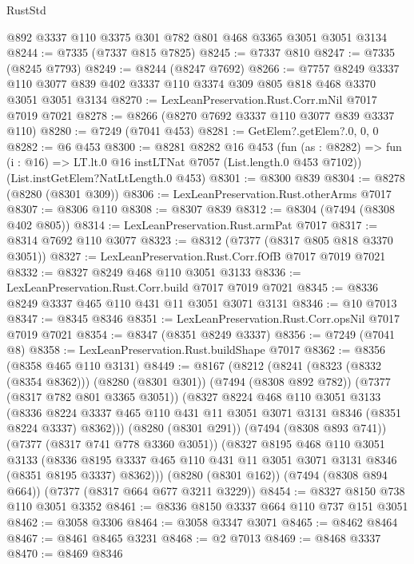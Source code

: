 \begin{lexlean}{RustStd}
\begin{coremodule}
{\begin{coremodule}
{{{{{{{{{{{{{{{{{{{{{{{{{{{{{{{{    @892
    @3337
    @110
    @3375
    @301
    @782
    @801
    @468
    @3365
    @3051
    @3051
    @3134
@8244 := @7335 (@7337 @815 @7825)
@8245 := @7337 @810
@8247 := @7335 (@8245 @7793)
@8249 := @8244 (@8247 @7692)
@8266 := @7757
    @8249
    @3337
    @110
    @3077
    @839
    @402
    @3337
    @110
    @3374
    @309
    @805
    @818
    @468
    @3370
    @3051
    @3051
    @3134
@8270 := LexLeanPreservation.Rust.Corr.mNil @7017 @7019 @7021
@8278 := @8266 (@8270 @7692 @3337 @110 @3077 @839 @3337 @110)
@8280 := @7249 (@7041 @453)
@8281 := GetElem?.getElem?.{0, 0, 0}
@8282 := @6 @453
@8300 := @8281
    @8282
    @16
    @453
    (fun (as : @8282) =>
    fun (i : @16) => LT.lt.{0} @16 instLTNat @7057 (List.length.{0} @453 @7102))
    (List.instGetElem?NatLtLength.{0} @453)
@8301 := @8300 @839
@8304 := @8278 (@8280 (@8301 @309))
@8306 := LexLeanPreservation.Rust.otherArms @7017
@8307 := @8306 @110
@8308 := @8307 @839
@8312 := @8304 (@7494 (@8308 @402 @805))
@8314 := LexLeanPreservation.Rust.armPat @7017
@8317 := @8314 @7692 @110 @3077
@8323 := @8312 (@7377 (@8317 @805 @818 @3370 @3051))
@8327 := LexLeanPreservation.Rust.Corr.fOfB @7017 @7019 @7021
@8332 := @8327 @8249 @468 @110 @3051 @3133
@8336 := LexLeanPreservation.Rust.Corr.build @7017 @7019 @7021
@8345 := @8336 @8249 @3337 @465 @110 @431 @11 @3051 @3071 @3131
@8346 := @10 @7013
@8347 := @8345 @8346
@8351 := LexLeanPreservation.Rust.Corr.opsNil @7017 @7019 @7021
@8354 := @8347 (@8351 @8249 @3337)
@8356 := @7249 (@7041 @8)
@8358 := LexLeanPreservation.Rust.buildShape @7017
@8362 := @8356 (@8358 @465 @110 @3131)
@8449 := @8167
    (@8212
      (@8241
        (@8323 (@8332 (@8354 @8362)))
        (@8280 (@8301 @301))
        (@7494 (@8308 @892 @782))
        (@7377 (@8317 @782 @801 @3365 @3051))
        (@8327
          @8224
          @468
          @110
          @3051
          @3133
          (@8336 @8224 @3337 @465 @110 @431 @11 @3051 @3071 @3131 @8346 (@8351 @8224 @3337) @8362)))
      (@8280 (@8301 @291))
      (@7494 (@8308 @893 @741))
      (@7377 (@8317 @741 @778 @3360 @3051))
      (@8327
        @8195
        @468
        @110
        @3051
        @3133
        (@8336 @8195 @3337 @465 @110 @431 @11 @3051 @3071 @3131 @8346 (@8351 @8195 @3337) @8362)))
    (@8280 (@8301 @162))
    (@7494 (@8308 @894 @664))
    (@7377 (@8317 @664 @677 @3211 @3229))
@8454 := @8327 @8150 @738 @110 @3051 @3352
@8461 := @8336 @8150 @3337 @664 @110 @737 @151 @3051
@8462 := @3058 @3306
@8464 := @3058 @3347 @3071
@8465 := @8462 @8464
@8467 := @8461 @8465 @3231
@8468 := @2 @7013
@8469 := @8468 @3337
@8470 := @8469 @8346
}}}}}}}}}}}}}}}}}}}}}}}}}}}}}}}}
\end{coremodule}}
\end{coremodule}
\end{lexlean}
